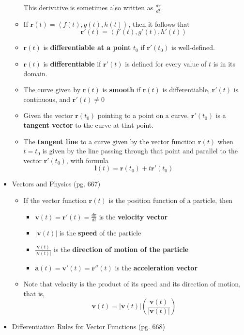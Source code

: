 \documentclass[12pt]{article}
\theoremstyle{plain}
\theoremstyle{definition}
\theoremstyle{remark}
\newcommand{\vect}[1]{\mathbf{#1}}
\begin{document}
\begin{itemize}
\begin{itemize}
		This derivative is sometimes also written as $\displaystyle \frac{d\vect{r}}{dt}$.
		\item If $\vect{r}(t) = \left<f(t),g(t),h(t)\right>$, then it follows that  \[\vect{r}'(t) = \left<f'(t),g'(t),h'(t)\right>\]
		\item $\vect{r}(t)$ is \textbf{differentiable at a point} $t_0$ if $\vect{r}'(t_0)$ is well-defined.
		\item $\vect{r}(t)$ is \textbf{differentiable} if $\vect{r}'(t)$ is defined for every value of $t$ is in its domain.
		\item The curve given by $\vect{r}(t)$ is \textbf{smooth} if $\vect{r}(t)$ is differentiable, $\vect{r}'(t)$ is continuous, and $\vect{r}'(t) \not= 0$
		\item Given the vector $\vect{r}(t_0)$ pointing to a point on a curve, $\vect{r}'(t_0)$ is a \textbf{tangent vector} to the curve at that point.
		\item The \textbf{tangent line} to a curve given by the vector function $\vect{r}(t)$ when $t=t_0$ is given by the line passing through that point and parallel to the vector $\vect{r}'(t_0)$, with formula \[\vect{l}(t)=\vect{r}(t_0)+t\vect{r}'(t_0)\]
		\end{itemize}
	\newpage
	\item Vectors and Physics (pg. 667)
		\begin{itemize}
		\item If the vector function $\vect{r}(t)$ is the position function of a particle, then
			\begin{itemize}
			\item $\vect{v}(t) = \vect{r}'(t) = \frac{d\vect{r}}{dt}$ is the \textbf{velocity vector}
			\item $|\vect{v}(t)|$ is the \textbf{speed} of the particle
			\item $\frac{\vect{v}(t)}{|\vect{v}(t)|}$ is the \textbf{direction of motion of the particle}
			\item $\vect{a}(t) = \vect{v}'(t) = \vect{r}''(t)$ is the \textbf{acceleration vector}
			\end{itemize}
		\item Note that velocity is the product of its speed and its direction of motion, that is, \[\vect{v}(t) = |\vect{v}(t)|\left(\frac{\vect{v}(t)}{|\vect{v}(t)|}\right)\]
		\end{itemize}
	
	\item Differentiation Rules for Vector Functions (pg. 668)
	

\end{itemize}
\end{document}
